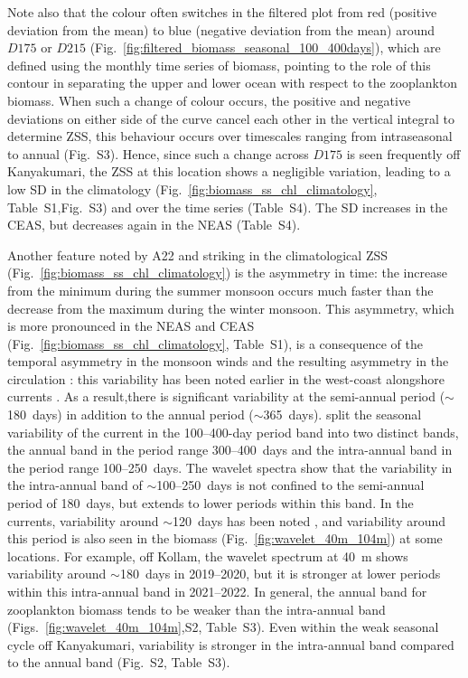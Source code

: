 \documentclass[authoryear,review,11pt]{elsarticle}
\begin{document}
Note also that the colour often switches in the filtered plot from red (positive deviation from the mean) to blue (negative deviation from the mean) around $D175$ or $D215$ (Fig.~\ref{fig:filtered_biomass_seasonal_100_400days}), which are defined using the monthly time series of biomass, pointing to the role of this contour in separating the upper and lower ocean with respect to the zooplankton biomass.  When such a change of colour occurs, the positive and negative deviations on either side of the curve cancel each other in the vertical integral to determine ZSS, this behaviour occurs over timescales ranging from intraseasonal to annual (Fig.~S3). Hence, since such a change across $D175$ is seen frequently off Kanyakumari, the ZSS at this location shows a negligible variation, leading to a low SD in the climatology (Fig.~\ref{fig:biomass_ss_chl_climatology}, Table~S1,Fig.~S3) and over the time series (Table~S4). The SD increases in the CEAS, but decreases again in the NEAS (Table~S4).

Another feature noted by A22 and striking in the climatological ZSS (Fig.~\ref{fig:biomass_ss_chl_climatology}) is the asymmetry in time: the increase from the minimum during the summer monsoon occurs much faster than the decrease from the maximum during the winter monsoon. This asymmetry, which is more pronounced in the NEAS and CEAS (Fig.~\ref{fig:biomass_ss_chl_climatology}, Table~S1), is a consequence of the temporal asymmetry in the monsoon winds and the resulting asymmetry in the circulation \citep[see, for example,][]{shankar2002monsoon, shankar2019role}: this variability has been noted earlier in the west-coast alongshore currents \citep{amol2014observed, chaudhuri2020observed}. As a result,there is significant variability at the semi-annual period ($\sim$180~days) in addition to the annual period ($\sim$365~days).  \citet{amol2014observed} split the seasonal variability of the current in the 100--400-day period band into two distinct bands, the annual band in the period range 300--400~days and the intra-annual band in the period range 100--250~days.  The wavelet spectra show that the variability in the intra-annual band of $\sim$100--250~days is not confined to the semi-annual period of 180~days, but extends to lower periods within this band.  In the currents, variability around $\sim$120~days has been noted \citep{amol2014observed, chaudhuri2020observed}, and variability around this period is also seen in the biomass (Fig.~\ref{fig:wavelet_40m_104m}) at some locations.  For example, off Kollam, the wavelet spectrum at 40~m shows variability around $\sim$180~days in 2019--2020, but it is stronger at lower periods within this intra-annual band in 2021--2022.  In general, the annual band for zooplankton biomass tends to be weaker than the intra-annual band (Figs.~\ref{fig:wavelet_40m_104m},S2, Table~S3).  Even within the weak seasonal cycle off Kanyakumari, variability is stronger in the intra-annual band compared to the annual band (Fig.~S2, Table~S3).
\end{document}
